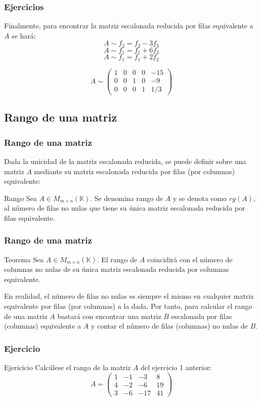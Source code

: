 \documentclass[aspectratio=169]{beamer}
\begin{document}
  \begin{frame}
  \frametitle{Ejercicios}
Finalmente, para encontrar la matriz escalonada reducida por filas equivalente a $A$ se har\'a:
\[A\sim f_2 = f_2-3f_3\]
\[A\sim f_1 = f_1+6f_3\]
\[A\sim f_1 = f_1+2f_2\]

\[A\sim \left(\begin{array}{ccccc}1 & 0 & 0 & 0 &-15 \\ 0 & 0 & 1 & 0 & -9 \\0 & 0 & 0 & 1 & 1/3\end{array}\right)\]
  \end{frame}   
  
  \subsection{Rango de una matriz}
 
  \begin{frame}
  \frametitle{Rango de una matriz}
Dada la unicidad de la matriz escalonada reducida, se puede definir sobre una matriz $A$ mediante su matriz escalonada reducida por filas (por columnas) equivalente:
   \begin{block}{Rango}
Sea $A\in M_{m\times n}(\mathbb{K})$. Se denomina rango de $A$ y se denota como $rg(A)$, al número de filas no nulas que tiene su \'unica matriz escalonada reducida por filas equivalente.
\end{block}
  \end{frame}   

  \begin{frame}
  \frametitle{Rango de una matriz}
   \begin{block}{Teorema}
Sea $A\in M_{m\times n}(\mathbb{K})$. El rango de $A$ coincidir\'a con el n\'umero de columnas no nulas de su \'unica matriz escalonada reducida por columnas equivalente.
\end{block}
En realidad, el n\'umero de filas no nulas es siempre el mismo en cualquier matriz equivalente por filas (por columnas) a la dada. Por tanto, para calcular el rango de una matriz $A$ bastar\'a con encontrar una matriz $B$ escalonada por filas (columnas) equivalente a $A$ y contar el n\'umero de filas (columnas) no nulas de $B$.
  \end{frame}   
  
  
     \begin{frame}
  \frametitle{Ejercicio}
   \begin{block}{Ejericicio}
Calc\'ulese el rango de la matriz $A$ del ejercicio 1 anterior:
\[A= \left(\begin{array}{cccc}1 & -1 & -3 & 8 \\4 & -2 & -6 & 19 \\3 & -6 & -17 & 41\end{array}\right)\]
\end{block}
  \end{frame} 
  
\end{document}
